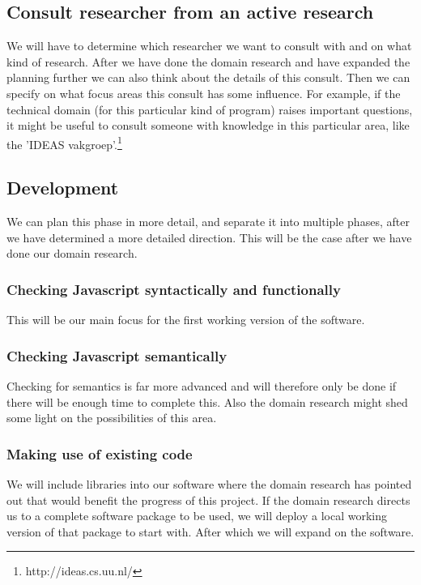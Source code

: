 \documentclass{article}
\begin{document}
\subsection{Consult researcher from an active research}
We will have to determine which researcher we want to consult with and on what kind of research. After we have done the domain research and have expanded the planning further we can also think about the details of this consult. Then we can specify on what focus areas this consult has some influence. For example, if the technical domain (for this particular kind of program) raises important questions, it might be useful to consult someone with knowledge in this particular area, like the 'IDEAS vakgroep'.\footnote{http://ideas.cs.uu.nl/}\\

\subsection{Development}
We can plan this phase in more detail, and separate it into multiple phases, after we have determined a more detailed direction. This will be the case after we have done our domain research.

\subsubsection{Checking Javascript syntactically and functionally}
This will be our main focus for the first working version of the software.
\subsubsection{Checking Javascript semantically}
Checking for semantics is far more advanced and will therefore only be done if there will be enough time to complete this. Also the domain research might shed some light on the possibilities of this area.
\subsubsection{Making use of existing code}
We will include libraries into our software where the domain research has pointed out that would benefit the progress of this project. If the domain research directs us to a complete software package to be used, we will deploy a local working version of that package to start with. After which we will expand on the software.
\end{document}
